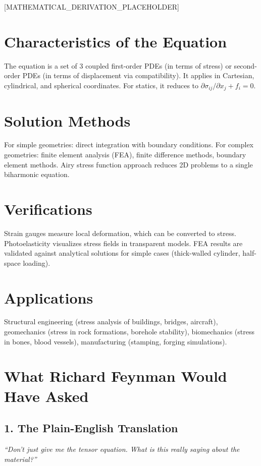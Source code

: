 \documentclass[11pt,openright]{book}
\begin{document}
[MATHEMATICAL_DERIVATION_PLACEHOLDER]

\section*{Characteristics of the Equation}

The equation is a set of 3 coupled first-order PDEs (in terms of stress) or second-order PDEs (in terms of displacement via compatibility). It applies in Cartesian, cylindrical, and spherical coordinates. For statics, it reduces to $\partial \sigma_{ij}/\partial x_j + f_i = 0$.
\section*{Solution Methods}

For simple geometries: direct integration with boundary conditions. For complex geometries: finite element analysis (FEA), finite difference methods, boundary element methods. Airy stress function approach reduces 2D problems to a single biharmonic equation.
\section*{Verifications}

Strain gauges measure local deformation, which can be converted to stress. Photoelasticity visualizes stress fields in transparent models. FEA results are validated against analytical solutions for simple cases (thick-walled cylinder, half-space loading).
\section*{Applications}

Structural engineering (stress analysis of buildings, bridges, aircraft), geomechanics (stress in rock formations, borehole stability), biomechanics (stress in bones, blood vessels), manufacturing (stamping, forging simulations).
\section*{What Richard Feynman Would Have Asked}

\subsection*{1. The Plain-English Translation}
\textit{``Don't just give me the tensor equation. What is this really saying about the material?''}
\end{document}

